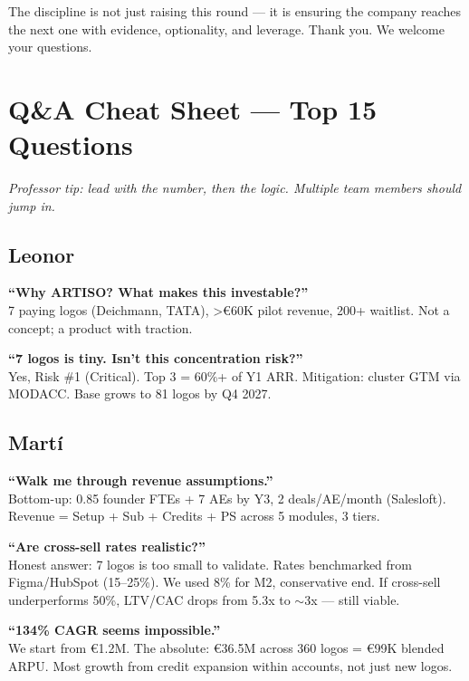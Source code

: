 \documentclass[11pt,a4paper]{article}
\begin{document}
The discipline is not just raising this round --- it is ensuring the company reaches the next one with evidence, optionality, and leverage. Thank you. We welcome your questions.

\section{Q\&A Cheat Sheet --- Top 15 Questions}

{\small\textit{Professor tip: lead with the number, then the logic. Multiple team members should jump in.}}

\subsection{Leonor}

\textbf{``Why ARTISO? What makes this investable?''}\\
7 paying logos (Deichmann, TATA), >\euro{}60K pilot revenue, 200+ waitlist. Not a concept; a product with traction.

\textbf{``7 logos is tiny. Isn't this concentration risk?''}\\
Yes, Risk \#1 (Critical). Top 3 = 60\%+ of Y1 ARR. Mitigation: cluster GTM via MODACC. Base grows to 81 logos by Q4 2027.

\subsection{Mart\'{i}}

\textbf{``Walk me through revenue assumptions.''}\\
Bottom-up: 0.85 founder FTEs + 7 AEs by Y3, 2 deals/AE/month (Salesloft). Revenue = Setup + Sub + Credits + PS across 5 modules, 3 tiers.

\textbf{``Are cross-sell rates realistic?''}\\
Honest answer: 7 logos is too small to validate. Rates benchmarked from Figma/HubSpot (15--25\%). We used 8\% for M2, conservative end. If cross-sell underperforms 50\%, LTV/CAC drops from 5.3x to $\sim$3x --- still viable.

\textbf{``134\% CAGR seems impossible.''}\\
We start from \euro{}1.2M. The absolute: \euro{}36.5M across 360 logos = \euro{}99K blended ARPU. Most growth from credit expansion within accounts, not just new logos.
\end{document}
